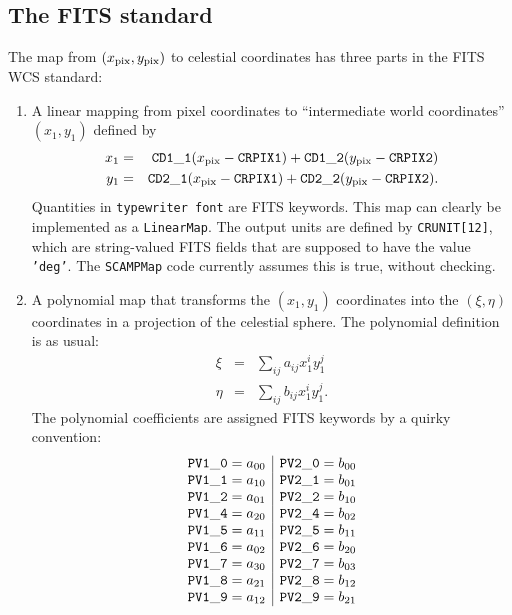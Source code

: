 \documentclass[11pt,preprint,flushrt]{aastex}
\begin{document}
\subsection{The FITS standard}
The map from $(x_{\rm pix},y_{\rm pix})$ to celestial coordinates has three parts in the FITS WCS standard:
\begin{enumerate}
\item A linear mapping from pixel coordinates to ``intermediate world coordinates'' $(x_1,y_1)$ defined by
\begin{eqnarray}
x_1 & = & {\tt CD1\_1}(x_{\rm pix}-{\tt CRPIX1}) + {\tt CD1\_2}(y_{\rm pix}-{\tt CRPIX2}) \\
y_1 & = & {\tt CD2\_1}(x_{\rm pix}-{\tt CRPIX1}) + {\tt CD2\_2}(y_{\rm pix}-{\tt CRPIX2}) .
\end{eqnarray}
Quantities in {\tt typewriter font} are FITS keywords.
This map can clearly be implemented as a {\tt LinearMap}.  The output units are defined by {\tt CRUNIT[12]}, which are string-valued FITS fields that are supposed to have the value {\tt 'deg'}.  The {\tt SCAMPMap} code currently assumes this is true, without checking.
\item A polynomial map that transforms the $(x_1,y_1)$ coordinates into the $(\xi,\eta)$ coordinates in a projection of the celestial sphere.  The polynomial definition is as usual:
\begin{eqnarray}
\xi & = & \sum_{ij} a_{ij} x_1^i y_1^j \\
\eta & = & \sum_{ij} b_{ij} x_1^i y_1^j.
\end{eqnarray}
The polynomial coefficients are assigned FITS keywords by a quirky convention:
\begin{equation}
\begin{array}{c|c}
{\tt PV1\_0} = a_{00} & {\tt PV2\_0} = b_{00} \\
{\tt PV1\_1} = a_{10} & {\tt PV2\_1} = b_{01} \\
{\tt PV1\_2} = a_{01} & {\tt PV2\_2} = b_{10} \\
{\tt PV1\_4} = a_{20} & {\tt PV2\_4} = b_{02} \\
{\tt PV1\_5} = a_{11} & {\tt PV2\_5} = b_{11} \\
{\tt PV1\_6} = a_{02} & {\tt PV2\_6} = b_{20} \\
{\tt PV1\_7} = a_{30} & {\tt PV2\_7} = b_{03} \\
{\tt PV1\_8} = a_{21} & {\tt PV2\_8} = b_{12} \\
{\tt PV1\_9} = a_{12} & {\tt PV2\_9} = b_{21} \\

\end{array}
\end{equation}
\end{enumerate}
\end{document}
